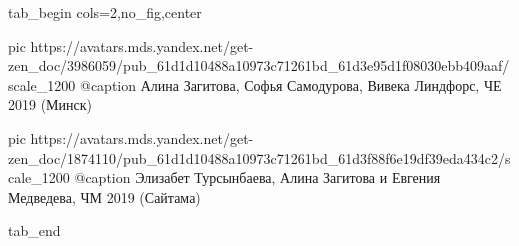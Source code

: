  
 
 
 
 


\ifcmt
  tab_begin cols=2,no_fig,center

     pic https://avatars.mds.yandex.net/get-zen_doc/3986059/pub_61d1d10488a10973c71261bd_61d3e95d1f08030ebb409aaf/scale_1200
		 @caption Алина Загитова, Софья Самодурова, Вивека Линдфорс, ЧЕ 2019 (Минск)

		 pic https://avatars.mds.yandex.net/get-zen_doc/1874110/pub_61d1d10488a10973c71261bd_61d3f88f6e19df39eda434c2/scale_1200
		 @caption Элизабет Турсынбаева, Алина Загитова и Евгения Медведева, ЧМ 2019 (Сайтама)

  tab_end
\fi
